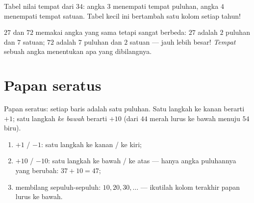 \begin{omfigure}

{\small Tabel nilai tempat dari $34$: angka $3$ menempati tempat
puluhan, angka $4$ menempati tempat satuan. Tabel kecil ini bertambah
satu kolom setiap tahun!}
\end{omfigure}

\begin{example}\label{ex:g1:tens:place}
$27$ dan $72$ memakai angka yang sama tetapi sangat berbeda: $27$
adalah $2$ puluhan dan $7$ satuan; $72$ adalah $7$ puluhan dan $2$
satuan --- jauh lebih besar! \emph{Tempat} sebuah angka menentukan
apa yang dibilangnya.
\end{example}

\section{Papan seratus}

\begin{omfigure}

{\small Papan seratus: setiap baris adalah satu puluhan. Satu langkah
ke kanan berarti $+1$; satu langkah \emph{ke bawah} berarti $+10$
(dari $44$ merah lurus ke bawah menuju $54$ biru).}
\end{omfigure}

\begin{method}\label{met:g1:tens:grid}
\begin{enumerate}
  \item $+1$ / $-1$: satu langkah ke kanan / ke kiri;
  \item $+10$ / $-10$: satu langkah ke bawah / ke atas --- hanya
        angka puluhannya yang berubah: $37 + 10 = 47$;
  \item membilang sepuluh-sepuluh: $10, 20, 30, \dots$ --- ikutilah
        kolom terakhir papan lurus ke bawah.
\end{enumerate}
\end{method}

